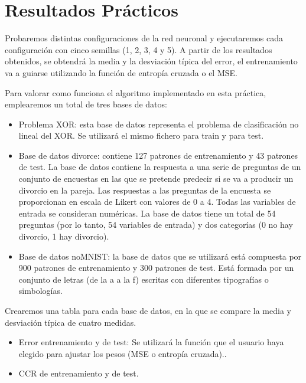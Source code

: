 \section{Resultados Prácticos}
Probaremos distintas configuraciones de la red neuronal y ejecutaremos cada configuración con cinco semillas (1, 2, 3, 4 y 5). A partir de los resultados obtenidos, se obtendrá la media y la desviación típica del error, el entrenamiento va a guiarse utilizando la función de
entropía cruzada o el MSE.

Para valorar como funciona el algoritmo implementado en esta práctica, emplearemos un total de tres bases de datos:
\begin{itemize}
\item Problema XOR: esta base de datos representa el problema de clasificación no lineal del XOR. Se utilizará el mismo fichero para train y para test.

\item Base de datos divorce: contiene 127 patrones de entrenamiento y 43 patrones de test. La base de datos contiene la respuesta a una serie de preguntas de un conjunto de encuestas en las que se pretende predecir si se va a producir un divorcio en la pareja. Las respuestas a las preguntas de la encuesta se proporcionan en escala de Likert con valores de 0 a 4. Todas
las variables de entrada se consideran numéricas. La base de datos tiene un total de 54 preguntas (por lo tanto, 54 variables de entrada) y dos
categorías (0 no hay divorcio, 1 hay divorcio).

\item Base de datos noMNIST: la base de datos que se utilizará está compuesta por 900 patrones de entrenamiento y 300 patrones de test. Está formada por un conjunto de letras (de la a a la f) escritas con diferentes tipografías o
simbologías.
\end{itemize}

Crearemos una tabla para cada base de datos, en la que se compare la media y desviación típica de cuatro medidas.
\begin{itemize}
\item Error entrenamiento y de test: Se utilizará la función que el usuario haya elegido para  ajustar los pesos (MSE o entropía cruzada)..
\item CCR de entrenamiento y de test.
\end{itemize}

